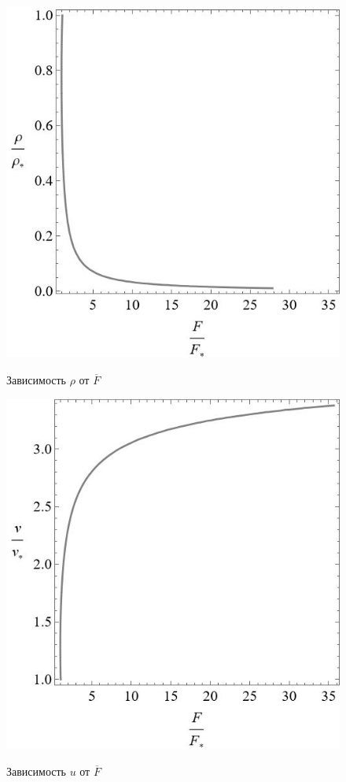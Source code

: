 \documentclass[12pt, a4paper]{article}
\begin{document}
	\begin{figure}[!htbp]
		\centering
		\begin{minipage}[b]{0.4\textwidth}
			{\includegraphics[width=\textwidth, height=\textwidth]{plot3}}
			\caption{Зависимость $\rho$ от $\overline{F}$}
		\end{minipage}
		\hfill
		\begin{minipage}[b]{0.4\textwidth}
			{\includegraphics[width=\textwidth, height=\textwidth]{plot4}}
			\caption{Зависимость $u$ от $\overline{F}$}
		\end{minipage}
		\label{plot-3-4}
	\end{figure}
\end{document}

